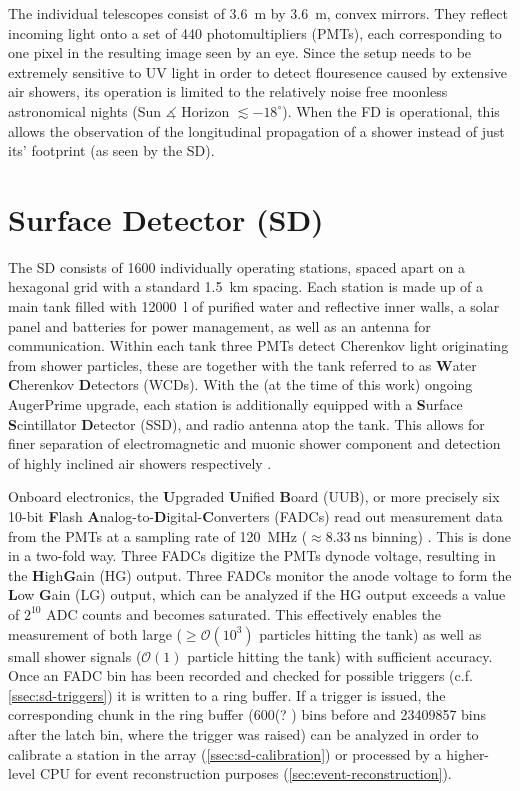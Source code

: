 The individual telescopes consist of \SI{3.6}{\meter} by \SI{3.6}{\meter}, convex mirrors. They reflect incoming light onto a set of 440 
photomultipliers (PMTs), each corresponding to one pixel in the resulting image seen by an eye. Since the setup needs to be extremely sensitive to 
UV light in order to detect flouresence caused by extensive air showers, its operation is limited to the relatively noise free moonless astronomical 
nights (Sun $\measuredangle$ Horizon $\lesssim-18^{\circ}$). When the FD is operational, this allows the observation of the longitudinal propagation of 
a shower instead of just its' footprint (as seen by the SD). 

\section{Surface Detector (SD)}
\label{sec:surface-detector}

The SD consists of 1600 individually operating stations, spaced apart on a hexagonal grid with a standard \SI{1.5}{\kilo\meter} spacing. Each 
station is made up of a main tank filled with \SI{12000}{\litre} of purified water and reflective inner walls, a solar panel and batteries for power management, 
as well as an antenna for communication. Within each tank three PMTs detect Cherenkov light originating from shower particles, these are together with the tank 
referred to as \textbf{W}ater \textbf{C}herenkov \textbf{D}etectors (WCDs). With the (at the time of this work) ongoing AugerPrime upgrade, each station is 
additionally equipped with a \textbf{S}urface \textbf{S}cintillator \textbf{D}etector (SSD), and radio antenna atop the tank. This allows for finer separation 
of electromagnetic and muonic shower component and detection of highly inclined air showers respectively \cite{AugerPrime, horandel2020precision}. 

Onboard electronics, the \textbf{U}pgraded \textbf{U}nified \textbf{B}oard (UUB), or more precisely six 10-bit \textbf{F}lash 
\textbf{A}nalog-to-\textbf{D}igital-\textbf{C}onverters (FADCs) read out measurement data from the PMTs at a sampling rate of \SI{120}{\mega\hertz} 
($\approx\SI{8.33}{\nano\second}$ binning) \cite{verzi2013energy}. This is done in a two-fold way. Three FADCs digitize the PMTs dynode voltage, resulting in the
\textbf{H}igh\textbf{G}ain (HG) output. Three FADCs monitor the anode voltage to form the \textbf{L}ow \textbf{G}ain (LG) output, which can be analyzed if the 
HG output exceeds a value of $2^{10}$ ADC counts and becomes saturated. This effectively enables the measurement of both large ($\geq\mathcal{O}(10^3)$ particles
hitting the tank) as well as small shower signals ($\mathcal{O}(1)$ particle hitting the tank) with sufficient accuracy. Once an FADC bin has been recorded and 
checked for possible triggers (c.f. \autoref{ssec:sd-triggers}) it is written to a ring buffer. If a trigger is issued, the corresponding chunk in the ring 
buffer (600(? \TODO) bins before and 23409857 bins after the latch bin, where the trigger was raised) can be analyzed in order to calibrate a station in the 
array (\autoref{ssec:sd-calibration}) or processed by a higher-level CPU for event reconstruction purposes (\autoref{sec:event-reconstruction}).

